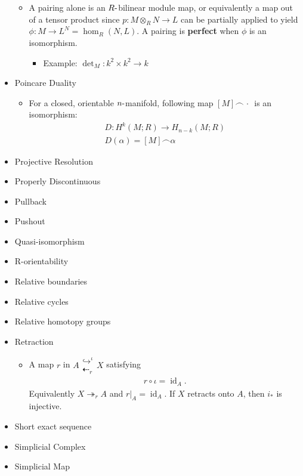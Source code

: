 \begin{itemize}
  \begin{itemize}
  \tightlist
  \item
    A pairing alone is an \(R{\hbox{-}}\)bilinear module map, or
    equivalently a map out of a tensor product since
    \(p: M\otimes_R N \to L\) can be partially applied to yield
    \(\phi: M \to L^N = \hom_R(N, L)\). A pairing is \textbf{perfect}
    when \(\phi\) is an isomorphism.

    \begin{itemize}
    \tightlist
    \item
      Example: \(\det_M: k^2 \times k^2 \to k\)
    \end{itemize}
  \end{itemize}
\item
  Poincare Duality

  \begin{itemize}
  \tightlist
  \item
    For a closed, orientable \(n{\hbox{-}}\)manifold, following map
    \([M] \frown {\,\cdot\,}\) is an isomorphism:
    \begin{align*} D: H^k(M; R) \to H_{n-k}(M; R) \\ D(\alpha) = [M] \frown \alpha\end{align*}
  \end{itemize}
\item
  Projective Resolution
\item
  Properly Discontinuous
\item
  Pullback
\item
  Pushout
\item
  Quasi-isomorphism
\item
  R-orientability
\item
  Relative boundaries
\item
  Relative cycles
\item
  Relative homotopy groups
\item
  Retraction

  \begin{itemize}
  \tightlist
  \item
    A map \(r\) in
    \(A\mathrel{\textstyle\substack{\hookrightarrow^{\iota}\\\textstyle\dashleftarrow_{r}}} X\)
    satisfying
    \begin{align*}r\circ\iota = \operatorname{id}_A.\end{align*}
    Equivalently \(X \twoheadrightarrow_r A\) and
    \({\left.{{r}} \right|_{{A}} } = \operatorname{id}_A\). If \(X\)
    retracts onto \(A\), then \(i_*\) is injective.
  \end{itemize}
\item
  Short exact sequence
\item
  Simplicial Complex
\item
  Simplicial Map


\end{itemize}

